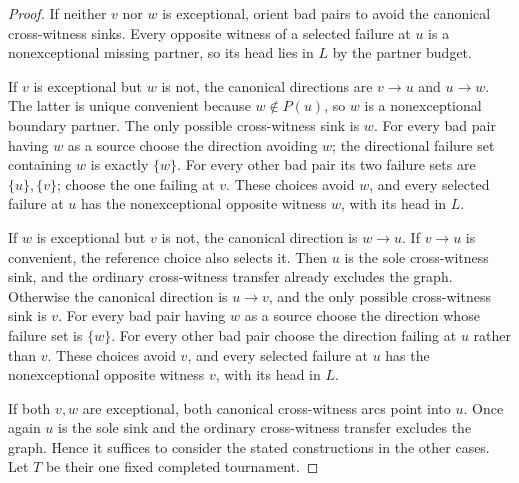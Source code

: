 \begin{proof}
If neither $v$ nor $w$ is exceptional, orient bad pairs to avoid the
canonical cross-witness sinks.  Every opposite witness of a selected
failure at $u$ is a nonexceptional missing partner, so its head lies
in $L$ by the partner budget.

If $v$ is exceptional but $w$ is not, the canonical directions are
$v\to u$ and $u\to w$.  The latter is unique convenient because
$w\notin P(u)$, so $w$ is a nonexceptional boundary partner.
The only possible cross-witness sink is $w$.
For every bad pair having $w$ as a source choose the direction
avoiding $w$; the directional failure set containing $w$ is exactly
$\{w\}$.  For every other bad pair its two failure sets are
$\{u\},\{v\}$; choose the one failing at $v$.
These choices avoid $w$, and every selected failure at $u$ has
the nonexceptional opposite witness $w$, with its head in $L$.

If $w$ is exceptional but $v$ is not, the canonical direction is
$w\to u$.  If $v\to u$ is convenient, the reference choice also
selects it.  Then $u$ is the sole cross-witness sink, and the ordinary
cross-witness transfer already excludes the graph.
Otherwise the canonical direction is $u\to v$, and the only
possible cross-witness sink is $v$.  For every bad pair having $w$
as a source choose the direction whose failure set is $\{w\}$.
For every other bad pair choose the direction failing at $u$
rather than $v$.  These choices avoid $v$, and every selected
failure at $u$ has the nonexceptional opposite witness $v$,
with its head in $L$.

If both $v,w$ are exceptional, both canonical cross-witness arcs
point into $u$.  Once again $u$ is the sole sink and the ordinary
cross-witness transfer excludes the graph.  Hence it suffices to
consider the stated constructions in the other cases.
Let $T$ be their one fixed completed tournament.


\end{proof}
